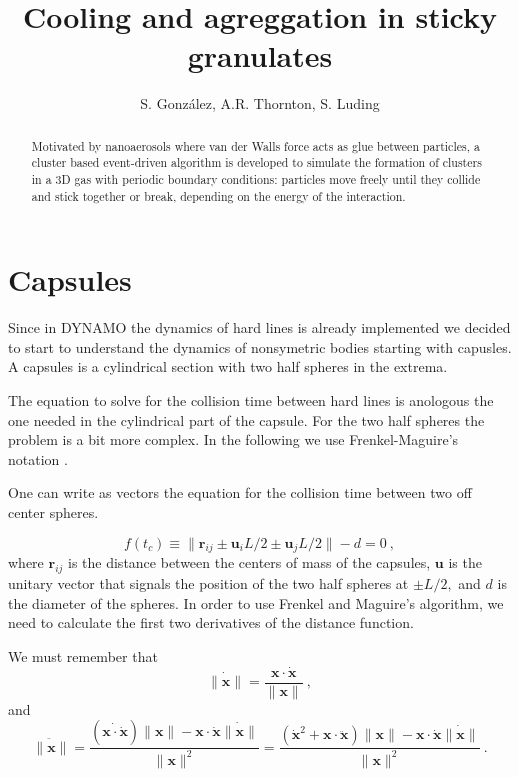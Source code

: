 \documentclass[aps,pre,onecolumn,preprint,showpacs]{revtex4}
\begin{document}
\title{Cooling and agreggation in sticky granulates}

\author{S. Gonz\'alez, A.R. Thornton, S. Luding}


\begin{abstract}

  Motivated by nanoaerosols where van der Walls force acts as glue
  between particles, a cluster based event-driven algorithm is
  developed to simulate the formation of clusters in a 3D gas with
  periodic boundary conditions: particles move freely until they
  collide and stick together or break, depending on the energy of the
 interaction.

\end{abstract}
\maketitle

\section{Capsules}

Since in DYNAMO the dynamics of hard lines is already implemented we
decided to start to understand the dynamics of nonsymetric bodies
starting with capusles. A capsules is a cylindrical section with two
half spheres in the extrema. 

The equation to solve for the collision time between hard lines is
anologous the one needed in the cylindrical part of the capsule. For
the two half spheres the problem is a bit more complex. In the
following we use Frenkel-Maguire's notation  \cite{frenkel}. 

One can write as vectors the equation for the collision time 
between two off center spheres. 

\begin{equation}
  \label{eq:f}
  f(t_c) \equiv \|\mathbf{r}_{ij} \pm \mathbf{u}_{i}L/2 \pm \mathbf{u}_{j}L/2\| - d = 0~,
\end{equation}
where $\mathbf{r}_{ij}$ is the distance between the centers of mass of
the capsules, $\mathbf{u}$ is the unitary vector that signals the
position of the two half spheres at $\pm L/2,$ and $d$ is the diameter 
of the spheres. In order to use Frenkel and Maguire's algorithm, we need to 
calculate the first two derivatives of the distance function.

We must remember that 
\begin{equation}
  \label{eq:xprime}
  \dot{\|\mathbf{x}\|}  = \frac{\mathbf{x}\cdotp\dot{\mathbf{x}}}{\|\mathbf{x}\|}~,
\end{equation}
and
\begin{equation}
    \label{eq:x2prime}
  \ddot{\|\mathbf{x}\|}  = 
  \frac{(\dot{\mathbf{x}\cdotp\dot{\mathbf{x}}})\|\mathbf{x}\| - \mathbf{x}\cdotp\dot{\mathbf{x}}\dot{\|\mathbf{x}\|} }{\|\mathbf{x}\|^2}
  = \frac{(\dot{\mathbf{x}}^2 + \mathbf{x}\cdotp\ddot{\mathbf{x}})\|\mathbf{x}\| - \mathbf{x}\cdotp\dot{\mathbf{x}}\dot{\|\mathbf{x}\|} }{\|\mathbf{x}\|^2}~.
\end{equation}
\end{document}

